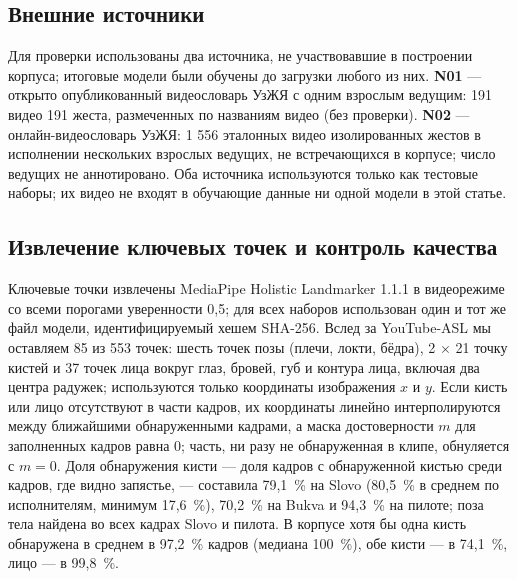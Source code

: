 \documentclass[a4paper,fleqn]{cas-dc}
\begin{document}
\hypertarget{ux432ux43dux435ux448ux43dux438ux435-ux438ux441ux442ux43eux447ux43dux438ux43aux438}{%
\subsection{Внешние источники}\label{ux432ux43dux435ux448ux43dux438ux435-ux438ux441ux442ux43eux447ux43dux438ux43aux438}}

Для проверки использованы два источника, не участвовавшие в построении корпуса; итоговые модели были обучены до загрузки любого из них. \textbf{N01} --- открыто опубликованный видеословарь УзЖЯ с одним взрослым ведущим: 191 видео 191 жеста, размеченных по названиям видео (без проверки). \textbf{N02} --- онлайн-видеословарь УзЖЯ: 1 556 эталонных видео изолированных жестов в исполнении нескольких взрослых ведущих, не встречающихся в корпусе; число ведущих не аннотировано. Оба источника используются только как тестовые наборы; их видео не входят в обучающие данные ни одной модели в этой статье.

\hypertarget{ux438ux437ux432ux43bux435ux447ux435ux43dux438ux435-ux43aux43bux44eux447ux435ux432ux44bux445-ux442ux43eux447ux435ux43a-ux438-ux43aux43eux43dux442ux440ux43eux43bux44c-ux43aux430ux447ux435ux441ux442ux432ux430}{%
\subsection{Извлечение ключевых точек и контроль качества}\label{ux438ux437ux432ux43bux435ux447ux435ux43dux438ux435-ux43aux43bux44eux447ux435ux432ux44bux445-ux442ux43eux447ux435ux43a-ux438-ux43aux43eux43dux442ux440ux43eux43bux44c-ux43aux430ux447ux435ux441ux442ux432ux430}}

Ключевые точки извлечены MediaPipe Holistic Landmarker 1.1.1 \cite{docs_mediapipe_holistic_landmarker} в видеорежиме со всеми порогами уверенности 0,5; для всех наборов использован один и тот же файл модели, идентифицируемый хешем SHA-256. Вслед за YouTube-ASL \cite{2023_uthus_youtube_asl} мы оставляем 85 из 553 точек: шесть точек позы (плечи, локти, бёдра), 2 $\times$ 21 точку кистей и 37 точек лица вокруг глаз, бровей, губ и контура лица, включая два центра радужек; используются только координаты изображения \(x\) и \(y\). Если кисть или лицо отсутствуют в части кадров, их координаты линейно интерполируются между ближайшими обнаруженными кадрами, а маска достоверности \(m\) для заполненных кадров равна 0; часть, ни разу не обнаруженная в клипе, обнуляется с \(m = 0\). Доля обнаружения кисти --- доля кадров с обнаруженной кистью среди кадров, где видно запястье, --- составила 79,1~\% на Slovo (80,5~\% в среднем по исполнителям, минимум 17,6~\%), 70,2~\% на Bukva и 94,3~\% на пилоте; поза тела найдена во всех кадрах Slovo и пилота. В корпусе хотя бы одна кисть обнаружена в среднем в 97,2~\% кадров (медиана 100~\%), обе кисти --- в 74,1~\%, лицо --- в 99,8~\%.
\end{document}
